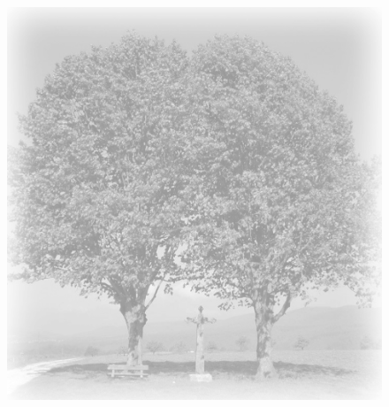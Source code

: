 \documentclass[ngerman,a4paper,11pt]{scrreprt}
\begin{document}
\begin{figure}[H]
\centering
\includegraphics[width=\textwidth,height=.8\textheight]{Bilder/Bilder/./750_0010_18433_1161980_Hintergrund_Baeume_und_Kreuz.png}
\end{figure}
\end{document}
